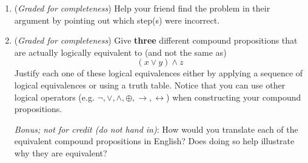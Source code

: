 \documentclass[12pt, oneside]{article}
\newcommand{\gradeComplete}{({\it Graded for completeness}) }
\begin{document}
\begin{enumerate}[labelindent=0pt, leftmargin=0pt]
\begin{enumerate}
        \item\gradeComplete 
        Help your friend find the problem in their argument by pointing out which step(s) were incorrect.
        
        \item\gradeComplete Give {\bf three} different compound propositions
        that are actually logically equivalent to (and not the same as)
        \[
            (x \lor y) \land z
        \]
        Justify each one of these logical equivalences either by applying a sequence of logical equivalences
        or using a truth table.  Notice that you can use other logical operators (e.g. $\lnot, \lor, \land, \oplus, \to, 
        \leftrightarrow$) 
        when constructing your compound propositions.
     
        {\it Bonus; not for credit (do not hand in)}: How would you translate each of the equivalent compound
        propositions in English? Does doing so help illustrate why they are equivalent?
        \end{enumerate}
        
     
\end{enumerate}

\newpage
\end{document}
